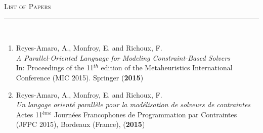 \thispagestyle{empty}
\hfill\Huge\textsc{List of Papers}\\
\normalsize
\noindent\rule[2pt]{\textwidth}{0.8pt}\\

\begin{enumerate}[I]  
  \item Reyes-Amaro, A., Monfroy, E. and Richoux, F.\\
  \textit{A Parallel-Oriented Language for Modeling Constraint-Based Solvers}\\
  In: Proceedings of the 11$^{th}$ edition of the Metaheuristics International Conference (MIC 2015). Springer (\textbf{2015})
  
  \item Reyes-Amaro, A., Monfroy, E. and Richoux, F.\\
  \textit{Un langage orienté parallèle pour la modélisation de solveurs de contraintes}\\ 
  Actes 11$^{ème}$ Journées Francophones de Programmation par Contraintes (JFPC 2015), Bordeaux (France), (\textbf{2015})
  
\end{enumerate}




